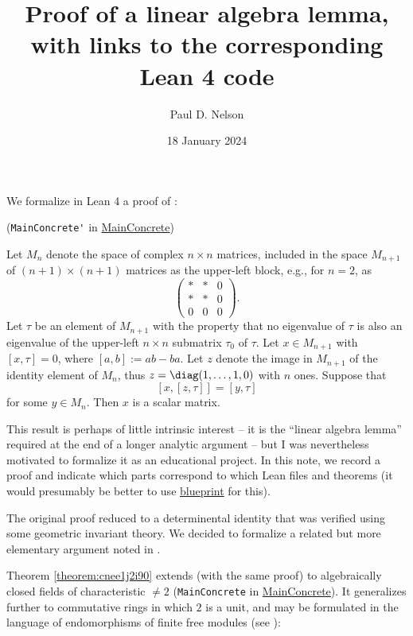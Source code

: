 \documentclass[reqno]{amsart} 
\title{Proof of a linear algebra lemma, with links to the corresponding Lean 4 code}
\author{Paul D. Nelson}
\date{18 January 2024}
\begin{document}
\maketitle

We formalize in Lean 4 a proof of \cite[Theorem 1.8]{2020arXiv201202187N}:

\begin{theorem}\label{theorem:cnee1j2i90}
  (\verb|MainConcrete'| in \href{MainConcrete.lean}{MainConcrete})

  Let $M_{n}$ denote the space of complex $n \times n$ matrices, included in the space $M_{n+1}$ of $(n+1) \times (n+1)$ matrices as the upper-left block, e.g., for $n = 2$, as
  \[
    \begin{pmatrix}
      \ast & \ast & 0 \\
      \ast & \ast & 0 \\
      0 & 0 & 0
    \end{pmatrix}.
  \]
  Let $\tau$ be an element of $M_{n+1}$ with the property that no eigenvalue of $\tau$ is also an eigenvalue of the upper-left $n \times n$ submatrix $\tau_0$ of $\tau$.  Let $x \in M_{n+1}$ with $[x,\tau] = 0$, where $[a,b] := a b -b a$.  Let $z$ denote the image in $M_{n+1}$ of the identity element of $M_n$, thus $z = \diag(1,\dotsc,1,0)$ with $n$ ones.  Suppose that
  \[
    [x,[z,\tau]] = [y, \tau]
  \]
  for some $y \in M_n$.  Then $x$ is a scalar matrix.
\end{theorem}

This result is perhaps of little intrinsic interest -- it is the ``linear algebra lemma'' required at the end of a longer analytic argument -- but I was nevertheless motivated to formalize it as an educational project.  In this note, we record a proof and indicate which parts correspond to which Lean files and theorems (it would presumably be better to use \href{https://github.com/PatrickMassot/leanblueprint}{blueprint} for this).

\begin{remark}
  The original proof reduced to a determinental identity \cite[Theorem 17.2]{2020arXiv201202187N} that was verified using some geometric invariant theory.  We decided to formalize a related but more elementary argument noted in \cite[Remark 5.15]{2023arXiv2309.06314}.
\end{remark}

Theorem \ref{theorem:cnee1j2i90} extends (with the same proof) to algebraically closed fields of characteristic $\neq 2$ (\verb|MainConcrete| in \href{MainConcrete.lean}{MainConcrete}).  It generalizes further to commutative rings in which $2$ is a unit, and may be formulated in the language of endomorphisms of finite free modules (see \cite[Remark 5.15]{2023arXiv2309.06314}):
\end{document}
